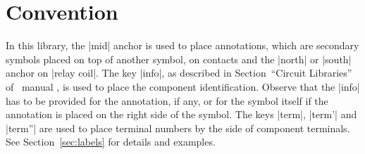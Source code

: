 \documentclass[a4paper]{ltxdoc}
\begin{document}
\section{Convention}
In this library, the |mid| anchor is used to place annotations, which are secondary symbols placed on top of another symbol, on contacts and the |north| or |south| anchor on |relay coil|. The key |info|, as described in Section~``Circuit Libraries'' of \tikzname\ manual \cite{Tantau}, is used to place the component identification. Observe that the |info| has to be provided for the annotation, if any, or for the symbol itself if the annotation is placed on the right side of the symbol. The keys |term|, |term'| and |term''| are used to place terminal numbers by the side of component terminals. See Section~\ref{sec:labels} for details and examples.
\end{document}
